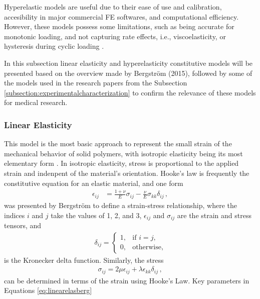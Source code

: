 Hyperelastic models are useful due to their ease of use and calibration, accesibility in major commercial FE softwares, 
and computational efficiency. However, these models possess some limitations, such as being 
accurate for monotonic loading, and not capturing rate effects, i.e., viscoelasticity, or 
hysteresis during cyclic loading \cite{Bergström2015}.

In this subsection linear elasticity and hyperelasticity constitutive models will be presented 
based on the overview made by Bergström (2015), followed by some of the models used in the research 
papers from the Subsection \ref{subsection:experimentalcharacterization} to confirm the relevance of these 
models for medical research.

\subsubsection*{Linear Elasticity}
This model is the most basic approach to represent the small strain of the mechanical behavior 
of solid polymers, with isotropic elasticity being its most elementary form \cite{Bergström2015}.
In isotropic elasticity, stress is proportional to the applied strain and indenpent of the material's 
orientation. Hooke's law is frequently the constitutive equation for an elastic material, and one form 
\begin{align}
        \epsilon_{ij} &= \frac{1 + \nu}{E} \sigma_{ij} - \frac{\nu}{E} \sigma_{kk} \delta_{ij} \, ,
        \label{eq:linearelasberg}
\end{align}  
was presented by Bergström to define a strain-stress relationship, where the indices $i$ and $j$ take the values of 
\SI{1}{}, \SI{2}{}, and \SI{3}{}, $\epsilon_{ij}$ and $\sigma_{ij}$ are the strain and stress tensors, and
\begin{align}
        \delta_{ij} = \begin{cases} 
                        1, & \text{if } i=j, \\
                        0, & \text{otherwise},
                      \end{cases}
\label{eq:kronecker}
\end{align}
is the Kronecker delta function. Similarly, the stress 
\begin{align}
        \sigma_{ij} = 2\mu\epsilon_{ij} + \lambda\epsilon_{kk}\delta_{ij} \, ,
        \label{eq:sigmalinearberg}
\end{align}
can be determined in terms of the strain using Hooke's Law. Key parameters in Equations \ref{eq:linearelasberg}
